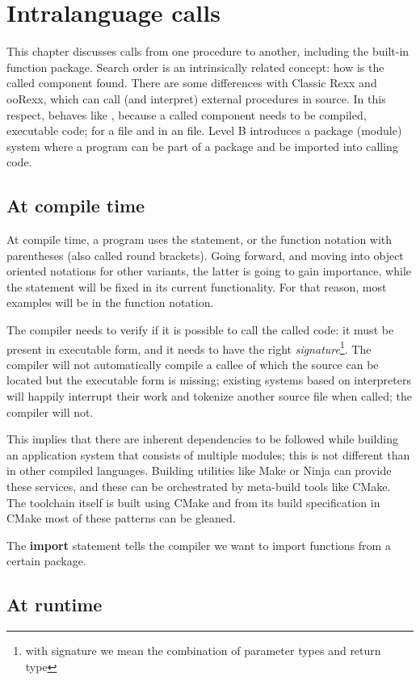 \chapter{Intralanguage calls}
This chapter discusses calls from one \crexx{} procedure to another,
including the built-in function package. Search order is an
intrinsically related concept: how is the called component found. There
are some differences with Classic Rexx and ooRexx, which can call (and interpret)
external procedures in source. In this respect, \crexx{} behaves like
\nr{}, because a called component needs to be compiled, executable
code; for \nr{} a  file and in \crexx{} an 
file. Level B introduces a package (module) system where a program can
be part of a package and be imported into calling code.
\section{At compile time}
At compile time, a program uses the  statement, or the
function notation with parentheses (also called round brackets). Going
forward, and moving into object oriented notations for other \rexx{}
variants, the latter is going to gain importance, while the
 statement will be fixed in its current functionality. For
that reason, most examples will be in the function notation.

The compiler needs to verify if it is possible to call the called
code: it must be present in executable form, and it needs to have the right
\emph{signature}\footnote{with signature we mean the combination of
  parameter types and return type}. The compiler will not automatically compile a callee
of which the source can be located but the executable form is missing;
existing systems based on interpreters will happily interrupt their
work and tokenize another source file when called; the \crexx{}
 compiler will not.

This implies that there are inherent dependencies to be followed
while building an application system that consists of multiple
modules; this is not different than in other compiled
languages. Building utilities like Make or Ninja can provide these
services, and these can be orchestrated by meta-build tools like
CMake. The \crexx{} toolchain itself is built using CMake and from its
build specification in CMake most of these patterns can be gleaned.

The \textbf{import} statement\label{intraImport} tells the compiler we want to
import functions from a certain package.


\section{At runtime}
